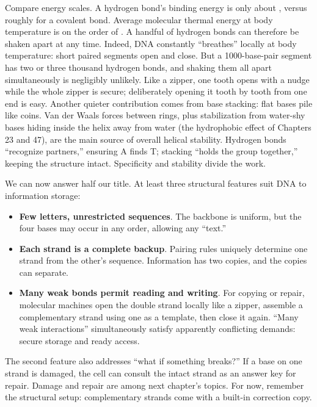 \begin{qiaoliang}
Compare energy scales. A hydrogen bond's binding energy is only about , versus roughly  for a covalent bond. Average molecular thermal energy at body temperature is on the order of . A handful of hydrogen bonds can therefore be shaken apart at any time. Indeed, DNA constantly ``breathes'' locally at body temperature: short paired segments open and close. But a 1000-base-pair segment has two or three thousand hydrogen bonds, and shaking them all apart simultaneously is negligibly unlikely. Like a zipper, one tooth opens with a nudge while the whole zipper is secure; deliberately opening it tooth by tooth from one end is easy. Another quieter contribution comes from base stacking: flat bases pile like coins. Van der Waals forces between rings, plus stabilization from water-shy bases hiding inside the helix away from water (the hydrophobic effect of Chapters 23 and 47), are the main source of overall helical stability. Hydrogen bonds ``recognize partners,'' ensuring A finds T; stacking ``holds the group together,'' keeping the structure intact. Specificity and stability divide the work.
\end{qiaoliang}

We can now answer half our title. At least three structural features suit DNA to information storage:

\begin{itemize}[itemsep=2pt]
\item \textbf{Few letters, unrestricted sequences}. The backbone is uniform, but the four bases may occur in any order, allowing any ``text.''
\item \textbf{Each strand is a complete backup}. Pairing rules uniquely determine one strand from the other's sequence. Information has two copies, and the copies can separate.
\item \textbf{Many weak bonds permit reading and writing}. For copying or repair, molecular machines open the double strand locally like a zipper, assemble a complementary strand using one as a template, then close it again. ``Many weak interactions'' simultaneously satisfy apparently conflicting demands: secure storage and ready access.
\end{itemize}

The second feature also addresses ``what if something breaks?'' If a base on one strand is damaged, the cell can consult the intact strand as an answer key for repair. Damage and repair are among next chapter's topics. For now, remember the structural setup: complementary strands come with a built-in correction copy.

